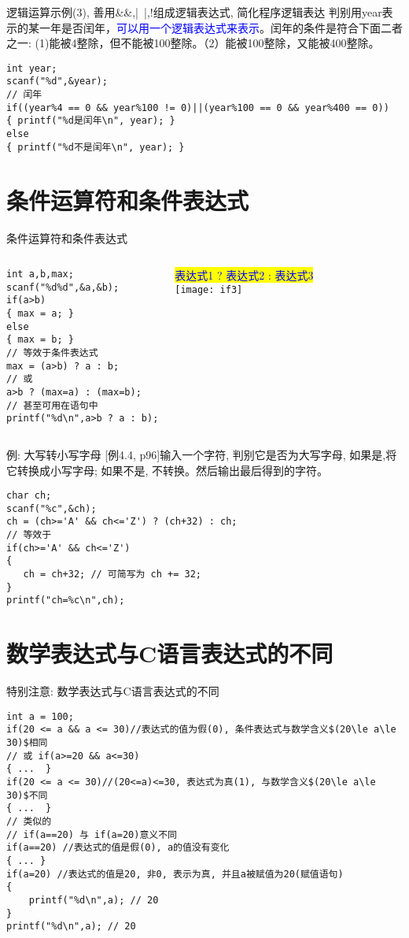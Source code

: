 \begin{frame}{逻辑运算示例(3), 善用\&\&,|~|,!组成逻辑表达式, 简化程序逻辑表达}
判别用year表示的某一年是否闰年，\textcolor{blue}{可以用一个逻辑表达式来表示}。闰年的条件是符合下面二者之一: (1)能被4整除，但不能被100整除。（2）能被100整除，又能被400整除。
\begin{lstlisting}
int year;
scanf("%d",&year);
// 闰年
if((year%4 == 0 && year%100 != 0)||(year%100 == 0 && year%400 == 0))
{ printf("%d是闰年\n", year); }
else
{ printf("%d不是闰年\n", year); }
\end{lstlisting}
\end{frame}

\section{条件运算符和条件表达式}

\begin{frame}{条件运算符和条件表达式}
\begin{columns}[T]
\begin{lstlisting}
int a,b,max;
scanf("%d%d",&a,&b);
if(a>b)
{ max = a; }
else
{ max = b; }
// 等效于条件表达式
max = (a>b) ? a : b;
// 或
a>b ? (max=a) : (max=b);
// 甚至可用在语句中
printf("%d\n",a>b ? a : b);
\end{lstlisting}
\colorbox{yellow}{\textcolor{blue}{表达式1 ? 表达式2 : 表达式3}}\\
\texttt{[image: if3]}
\end{columns}
\end{frame}

\begin{frame}{例: 大写转小写字母}
[例4.4, p96]输入一个字符, 判别它是否为大写字母, 如果是,将它转换成小写字母; 如果不是, 不转换。然后输出最后得到的字符。
\begin{lstlisting}
char ch;
scanf("%c",&ch);
ch = (ch>='A' && ch<='Z') ? (ch+32) : ch;
// 等效于
if(ch>='A' && ch<='Z')
{
   ch = ch+32; // 可简写为 ch += 32;
}
printf("ch=%c\n",ch);
\end{lstlisting}
\end{frame}

\section{数学表达式与C语言表达式的不同}

\begin{frame}{特别注意: 数学表达式与C语言表达式的不同}
\vspace{-0.3cm}
\begin{lstlisting}
int a = 100;
if(20 <= a && a <= 30)//表达式的值为假(0), 条件表达式与数学含义$(20\le a\le 30)$相同
// 或 if(a>=20 && a<=30)
{ ...  }
if(20 <= a <= 30)//(20<=a)<=30, 表达式为真(1), 与数学含义$(20\le a\le 30)$不同
{ ...  }
// 类似的
// if(a==20) 与 if(a=20)意义不同
if(a==20) //表达式的值是假(0), a的值没有变化
{ ... }
if(a=20) //表达式的值是20, 非0, 表示为真, 并且a被赋值为20(赋值语句)
{
    printf("%d\n",a); // 20 
}
printf("%d\n",a); // 20 
\end{lstlisting}
\end{frame}

